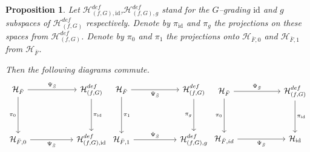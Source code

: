 \documentclass[reqno,12pt]{amsart}
\numberwithin{equation}{section}
\theoremstyle{plain}
\newtheorem{proposition}[theorem]{Proposition}
\theoremstyle{definition}
\newcommand{\id}{\mathrm{id}}
\def\H{{\mathcal H}}
\numberwithin{equation}{section}
\begin{document}
\begin{proposition}{\label{MainProp2}}
    Let $\H_{(f,G), \id}^{def}$,$\H_{(f,G), g}^{def}$ stand for the $G$--grading $\id$ and $g$ subspaces of $\H_{(f,G)}^{def}$ respectively. Denote by $\pi_\id$ and $\pi_g$ the projections on these spaces from $\H_{(f,G)}^{def}$.
    Denote by $\pi_0$ and $\pi_1$ the projections onto $\H_{\bar{F},0}$ and $\H_{\bar{F},1}$ from $\H_{\bar F}$.
    
    Then the following diagrams commute.
    \[
    \begin{tikzcd}[sep=scriptsize]
        {\H_{\bar{F}} } &&& {\H^{def}_{(f,G)}}\\
        \\
        \\
        {\H_{\bar{F},0} } &&& {\H^{def}_{(f,G), \id}}
        \arrow["{\Psi_{\bar{S}}}", from=1-1, to=1-4]
        \arrow["{\pi_0}"', from=1-1, to=4-1]
        \arrow["{\pi_\id}", from=1-4, to=4-4]
        \arrow["{\Psi_{\bar{S}}}"', from=4-1, to=4-4]
    \end{tikzcd}
    \begin{tikzcd}[sep=scriptsize]
        {\H_{\bar{F}} } &&& {\H^{def}_{(f,G)}} \\
        \\
        \\
        {\H_{\bar{F},1} } &&& {\H^{def}_{(f,G), g}}
        \arrow["{\Psi_{\bar{S}}}"', from=1-1, to=1-4]
        \arrow["{\pi_1}", from=1-1, to=4-1]
        \arrow["{\pi_g}"', from=1-4, to=4-4]
        \arrow["{\Psi_{\bar{S}}}", from=4-1, to=4-4]
    \end{tikzcd}
    \begin{tikzcd}[sep=scriptsize]
        {\H_{\bar{F}} } &&& {\H^{def}_{(f,G)}} \\
        \\
        \\
        {\H_{\bar{F},id}} &&& {\H_{\id}}
        \arrow["{\Psi_{\bar{S}}}", from=1-1, to=1-4]
        \arrow["{\pi_0}"', from=1-1, to=4-1]
        \arrow["{\pi_\id}", from=1-4, to=4-4]
        \arrow["{\Psi_{\bar{S}}}"', from=4-1, to=4-4]
    \end{tikzcd}
    \]

\end{proposition}
\end{document}
